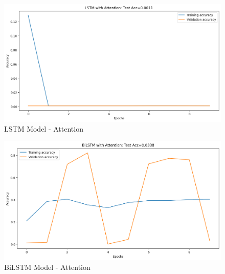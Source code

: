 \documentclass[11pt]{article}
\begin{document}
\begin{center}
    \begin{figure}[htp]
    \begin{center}
    \includegraphics [scale=0.3] {ltsm1}
    \end{center}
    \caption{LSTM Model - Attention}
    \label{refhinh1}
    \end{figure}
\end{center}

\begin{center}
    \begin{figure}[htp]
    \begin{center}
    \includegraphics [scale=0.3] {biltsm1}
    \end{center}
    \caption{BiLSTM Model - Attention}
    \label{refhinh1}
    \end{figure}
\end{center}
\end{document}
